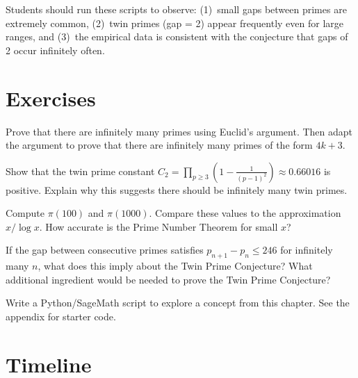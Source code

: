 \begin{highlightbox}
Students should run these scripts to observe: (1)~small gaps between primes are extremely common, (2)~twin primes (gap = 2) appear frequently even for large ranges, and (3)~the empirical data is consistent with the conjecture that gaps of 2 occur infinitely often.
\end{highlightbox}

\section{Exercises}

\begin{exercise}[Basic]
Prove that there are infinitely many primes using Euclid's argument. Then adapt the argument to prove that there are infinitely many primes of the form $4k + 3$.
\end{exercise}

\begin{exercise}[Intermediate]
Show that the twin prime constant $C_2 = \prod_{p \geq 3} \left(1 - \frac{1}{(p-1)^2}\right) \approx 0.66016$ is positive. Explain why this suggests there should be infinitely many twin primes.
\end{exercise}

\begin{exercise}[Challenge]
Compute $\pi(100)$ and $\pi(1000)$. Compare these values to the approximation $x/\log x$. How accurate is the Prime Number Theorem for small $x$?
\end{exercise}

\begin{exercise}
If the gap between consecutive primes satisfies $p_{n+1} - p_n \leq 246$ for infinitely many $n$, what does this imply about the Twin Prime Conjecture? What additional ingredient would be needed to prove the Twin Prime Conjecture?
\end{exercise}


\begin{exercise}[Computational]
Write a Python/SageMath script to explore a concept from this chapter. See the appendix for starter code.
\end{exercise}

\section{Timeline}

